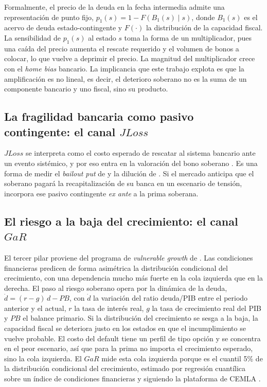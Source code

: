 Formalmente, el precio de la deuda en la fecha intermedia admite una representación de punto fijo, $p_1(s)=1-F\!\left(B_1(s)\mid s\right)$, donde $B_1(s)$ es el acervo de deuda estado-contingente y $F(\cdot)$ la distribución de la capacidad fiscal. La sensibilidad de $p_1(s)$ al estado $s$ toma la forma de un multiplicador, pues una caída del precio aumenta el rescate requerido y el volumen de bonos a colocar, lo que vuelve a deprimir el precio. La magnitud del multiplicador crece con el \textit{home bias} bancario. La implicancia que este trabajo explota es que la amplificación es no lineal, es decir, el deterioro soberano no es la suma de un componente bancario y uno fiscal, sino su producto.

\subsection{La fragilidad bancaria como pasivo contingente: el canal \texorpdfstring{$JLoss$}{JLoss}}

$JLoss$ se interpreta como el costo esperado de rescatar al sistema bancario ante un evento sistémico, y por eso entra en la valoración del bono soberano \citep{Chari2024b}. Es una forma de medir el \textit{bailout put} de \citet{FarhiTirole2018b} y la dilución de \citet{AcharyaDrechslerSchnabl2014b}. Si el mercado anticipa que el soberano pagará la recapitalización de su banca en un escenario de tensión, incorpora ese pasivo contingente \textit{ex ante} a la prima soberana.

\subsection{El riesgo a la baja del crecimiento: el canal \texorpdfstring{$GaR$}{GaR}}

El tercer pilar proviene del programa de \textit{vulnerable growth} de \citet{ABG2019b}. Las condiciones financieras predicen de forma asimétrica la distribución condicional del crecimiento, con una dependencia mucho más fuerte en la cola izquierda que en la derecha. El paso al riesgo soberano opera por la dinámica de la deuda, $\dot d=(r-g)\,d-PB$, con $\dot d$ la variación del ratio deuda/PIB entre el periodo anterior y el actual, $r$ la tasa de interés real, $g$ la tasa de crecimiento real del PIB y $PB$ el balance primario. Si la distribución del crecimiento se sesga a la baja, la capacidad fiscal se deteriora justo en los estados en que el incumplimiento se vuelve probable. El costo del default tiene un perfil de tipo opción y se concentra en el peor escenario, así que para la prima no importa el crecimiento esperado, sino la cola izquierda. El $GaR$ mide esta cola izquierda porque es el cuantil 5\% de la distribución condicional del crecimiento, estimado por regresión cuantílica \citep{KoenkerBassett1978,Koenker2004} sobre un índice de condiciones financieras y siguiendo la plataforma de CEMLA \citep{OssandonBusch2022}.

